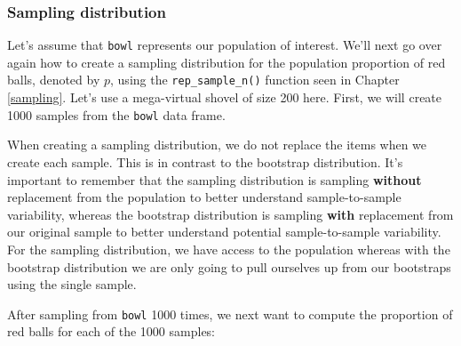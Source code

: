 \documentclass[12pt, krantz2,]{krantz}
\makeatletter
\newenvironment{Shaded}{\begin{snugshade}}{\end{snugshade}}
\newcommand{\DataTypeTok}[1]{\textcolor[rgb]{0.27,0.27,0.27}{#1}}
\newcommand{\DecValTok}[1]{\textcolor[rgb]{0.06,0.06,0.06}{#1}}
\newcommand{\KeywordTok}[1]{\textcolor[rgb]{0.27,0.27,0.27}{\textbf{#1}}}
\newcommand{\NormalTok}[1]{#1}
\newcommand{\OperatorTok}[1]{\textcolor[rgb]{0.43,0.43,0.43}{\textbf{#1}}}
\newcommand{\OtherTok}[1]{\textcolor[rgb]{0.37,0.37,0.37}{#1}}
\newcommand{\StringTok}[1]{\textcolor[rgb]{0.5,0.5,0.5}{#1}}
\newenvironment{kframe}{%
\medskip{}
\setlength{\fboxsep}{.8em}
 \def\at@end@of@kframe{}%
 \ifinner\ifhmode%
  \def\at@end@of@kframe{\end{minipage}}%
  \begin{minipage}{\columnwidth}%
 \fi\fi%
 \def\FrameCommand##1{\hskip\@totalleftmargin \hskip-\fboxsep
 \colorbox{shadecolor}{##1}\hskip-\fboxsep
     \hskip-\linewidth \hskip-\@totalleftmargin \hskip\columnwidth}%
 \MakeFramed {\advance\hsize-\width
   \@totalleftmargin\z@ \linewidth\hsize
   \@setminipage}}%
 {\par\unskip\endMakeFramed%
 \at@end@of@kframe}
\renewenvironment{Shaded}{\begin{kframe}}{\end{kframe}}
\makeatother
\begin{document}
\hypertarget{sampling-distribution}{%
\subsubsection*{Sampling distribution}\label{sampling-distribution}}


Let's assume that \texttt{bowl} represents our population of interest. We'll next go over again how to create a sampling distribution for the population proportion of red balls, denoted by \(p\), using the \texttt{rep\_sample\_n()} function seen in Chapter \ref{sampling}. Let's use a mega-virtual shovel of size 200 here. First, we will create 1000 samples from the \texttt{bowl} data frame.

\begin{Shaded}
\end{Shaded}

When creating a sampling distribution, we do not replace the items when we create each sample. This is in contrast to the bootstrap distribution. It's important to remember that the sampling distribution is sampling \textbf{without} replacement from the population to better understand sample-to-sample variability, whereas the bootstrap distribution is sampling \textbf{with} replacement from our original sample to better understand potential sample-to-sample variability. For the sampling distribution, we have access to the population whereas with the bootstrap distribution we are only going to pull ourselves up from our bootstraps using the single sample.

After sampling from \texttt{bowl} 1000 times, we next want to compute the proportion of red balls for each of the 1000 samples:

\begin{Shaded}
\end{Shaded}
\end{document}
